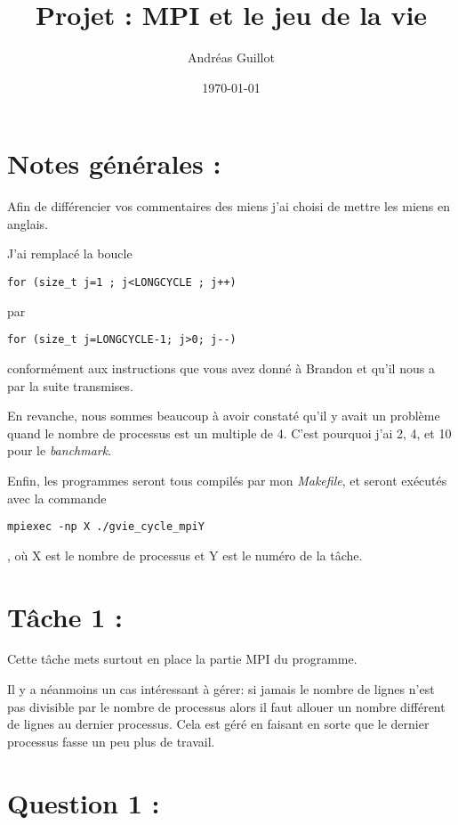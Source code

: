 \documentclass{article}
\title{Projet : MPI et le jeu de la vie}
\author{Andréas Guillot}
\date{\today}
\begin{document}
\maketitle

\section{Notes générales :}

Afin de différencier vos commentaires des miens j'ai choisi de mettre les miens en anglais.

J'ai remplacé la boucle
\begin{verbatim}
for (size_t j=1 ; j<LONGCYCLE ; j++)
\end{verbatim} par \begin{verbatim}
for (size_t j=LONGCYCLE-1; j>0; j--)
\end{verbatim} conformément aux instructions que vous avez donné à Brandon et qu'il nous a par la suite transmises.

\medskip

En revanche, nous sommes beaucoup à avoir constaté qu'il y avait un problème quand le nombre de processus est un multiple de 4. C'est pourquoi j'ai 2, 4, et 10 pour le \textit{banchmark}.

\medskip

Enfin, les programmes seront tous compilés par mon \textit{Makefile}, et seront exécutés avec la commande \begin{verbatim}
mpiexec -np X ./gvie_cycle_mpiY
\end{verbatim}, où X est le nombre de processus et Y est le numéro de la tâche.

\section{Tâche 1 :}

Cette tâche mets surtout en place la partie MPI du programme.

\medskip

Il y a néanmoins un cas intéressant à gérer: si jamais le nombre de lignes n'est pas divisible par le nombre de processus alors il faut allouer un nombre différent de lignes au dernier processus.
Cela est géré en faisant en sorte que le dernier processus fasse un peu plus de travail.

\section{Question 1 :}
\end{document}
